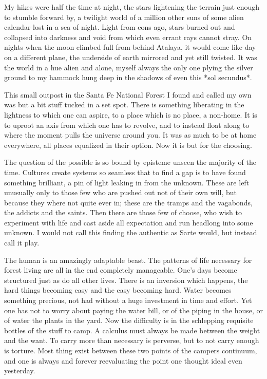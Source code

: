 \documentclass[ebook, 10pt, openright, onecolumn]{memoir}
\newcommand*\td[1]{
  \todo[inline]{
     #1 
  }
}
\newcommand*\finish{\td{ ----- Finish this section -----}}
\begin{document}
My hikes were half the time at night, the stars lightening the terrain just
enough to stumble forward by, a twilight world of a million other suns of some
alien calendar lost in a sea of night.  Light from eons ago, stars burned out
and collapsed into darkness and void from which even errant rays cannot stray.
On nights when the moon climbed full from behind Atalaya, it would come like day
on a different plane, the underside of earth mirrored and yet still twisted.  It
was the world in a hue alien and alone, myself always the only one plying the
silver ground to my hammock hung deep in the shadows of even this *sol
secundus*.

This small outpost in the Santa Fe National Forest I found and called my own was
but a bit stuff tucked in a set spot.  There is something liberating in the
lightness to which one can aspire, to a place which is no place, a non-home.  It
is to uproot an axis from which one has to revolve, and to instead float along
to where the moment pulls the universe around you.  It was as much to be at home
everywhere, all places equalized in their option. Now it is but for the
choosing.  

\finish

The question of the possible is so bound by episteme unseen the majority of the
time.  Cultures create systems so seamless that to find a gap is to have found
something brilliant, a pin of light leaking in from the unknown.  These are left
unusually only to those few who are pushed out not of their own will, but
because they where not quite ever in; these are the tramps and the vagabonds,
the addicts and the saints.  Then there are those few of choose, who wish to
experiment with life and cast aside all expectation and run headlong into some
unknown.  I would not call this finding the authentic as Sarte would, but
instead call it play.

The human is an amazingly adaptable beast.  The patterns of life necessary for
forest living are all in the end completely manageable.  One's days become
structured just as do all other lives.  There is an inversion which happens, the
hard things becoming easy and the easy becoming hard.  Water becomes something
precious, not had without a huge investment in time and effort.  Yet one has not
to worry about paying the water bill, or of the piping in the house, or of water
the plants in the yard.  Now the difficulty is in the schlepping requisite
bottles of the stuff to camp.  A calculus must always be made between the weight
and the want.  To carry more than necessary is perverse, but to not carry enough
is torture.  Most thing exist between these two points of the campers continuum,
and one is always and forever reevaluating the point one thought ideal even
yesterday.
\end{document}
